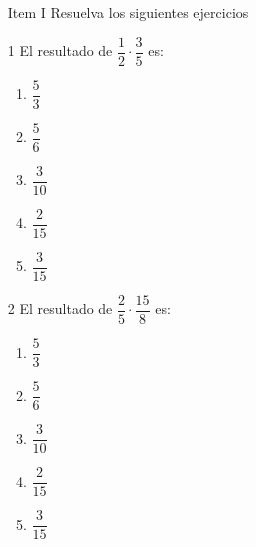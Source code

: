 \documentclass[12pt]{article}
\begin{document}
		\begin{enumerate}
		\item [Item I] Resuelva los siguientes ejercicios
	\end{enumerate}
\begin{multicols}{2}
	\begin{enumerate}
		\item [1] El resultado de $\dfrac{1}{2} \cdot \dfrac{3}{5}$	es: 
	\begin{enumerate}
	\item $\dfrac{5}{3}$\\
	\item $\dfrac{5}{6}$\\
	\item $\dfrac{3}{10}$\\
	\item $\dfrac{2}{15}$\\
	\item $\dfrac{3}{15}$\\
\end{enumerate}
\end{enumerate}

\begin{enumerate}
\item [2]El resultado de $\dfrac{2}{5} \cdot \dfrac{15}{8}$	es:
\begin{enumerate}
	\item $\dfrac{5}{3}$\\
	\item $\dfrac{5}{6}$\\
	\item $\dfrac{3}{10}$\\
	\item $\dfrac{2}{15}$\\
	\item $\dfrac{3}{15}$\\
\end{enumerate}
\end{enumerate}
\end{multicols}
\end{document}
